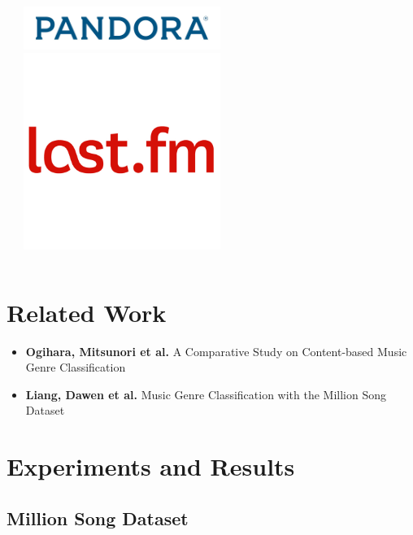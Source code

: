 \documentclass{beamer}
\begin{document}
\begin{frame}
\begin{columns}[t]
\begin{column}{.5\textwidth}
\end{column}
\begin{column}{.5\textwidth}
\includegraphics[width=0.5\textwidth]{img/LogoPandora.jpg}
\includegraphics[width=0.5\textwidth]{img/LogoLastfm.png}  
\end{column}
\end{columns}
\end{frame}

\section{Related Work}
\begin{frame}
\begin{itemize}
  \item \textbf{Ogihara, Mitsunori et al.} A Comparative Study on Content-based
  Music Genre Classification
  \item \textbf{Liang, Dawen et al. }Music Genre Classification
with the Million Song Dataset
\end{itemize}
\end{frame}

\section{Experiments and Results}
\subsection{Million Song Dataset}
\end{document}

